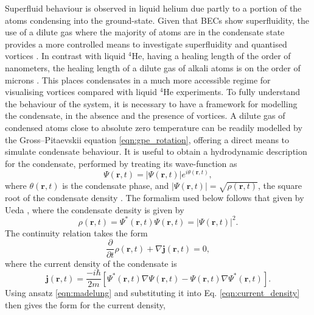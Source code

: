 Superfluid behaviour is observed in liquid helium due partly to a portion of the atoms condensing into the ground-state. Given that BECs show superfluidity, the use of a dilute gas where the majority of atoms are in the condensate state provides a more controlled means to investigate superfluidity and quantised vortices \cite{BK:Ueda_2010,BEC:Srinivasen_pramana_2006,Vtx:Tsubota_arxiv_2010,CT:Tsubota_jpsj_2008}. In contrast with liquid $^4$He, having a healing length of the order of nanometers, the healing length of a dilute gas of alkali atoms is on the order of microns \cite{Vtx:Isoshima_pra_1999}. This places condensates in a much more accessible regime for visualising vortices compared with liquid $^4$He experiments. To fully understand the behaviour of the system, it is necessary to have a framework for modelling the condensate, in the absence and the presence of vortices. A dilute gas of condensed atoms close to absolute zero temperature can be readily modelled by the Gross--Pitaevskii equation \eqref{eqn:gpe_rotation}, offering a direct means to simulate condensate behaviour. It is useful to obtain a hydrodynamic description for the condensate, performed by treating its wave-function as
\begin{equation}\label{eqn:madelung}
\Psi(\textbf{r},t) = \vert\Psi(\textbf{r},t)\vert e^{i\theta(\textbf{r},t)},
\end{equation}
where $\theta(\textbf{r},t)$ is the condensate phase, and $\vert\Psi(\textbf{r},t)\vert=\sqrt{\rho(\textbf{r},t)}$, the square root of the condensate density \cite[~chap. 1]{BK:Pitaevskii_Stringari_2003}.
The formalism used below follows that given by Ueda \cite{BK:Ueda_2010}, where the condensate density is given by
\begin{equation}\label{eqn:density}
\rho(\textbf{r},t) = \Psi^*(\textbf{r},t)\Psi(\textbf{r},t) = \vert \Psi (\textbf{r},t) \vert ^2.
\end{equation}
The continuity relation takes the form
\begin{equation}\label{eqn:continuity}
\frac{\partial}{\partial t}\rho(\textbf{r},t)  + \nabla \textbf{j}(\textbf{r},t) = 0,
\end{equation}
where the current density of the condensate is
\begin{equation}\label{eqn:current_density}
\textbf{j}(\textbf{r},t) = \frac{-i\hbar}{2m}\left[\Psi^*(\textbf{r},t)\nabla\Psi(\textbf{r},t) - \Psi(\textbf{r},t)\nabla\Psi^*(\textbf{r},t)\right].
\end{equation}
Using ansatz \eqref{eqn:madelung} and substituting it into Eq. \eqref{eqn:current_density} then gives the form for the current density,
